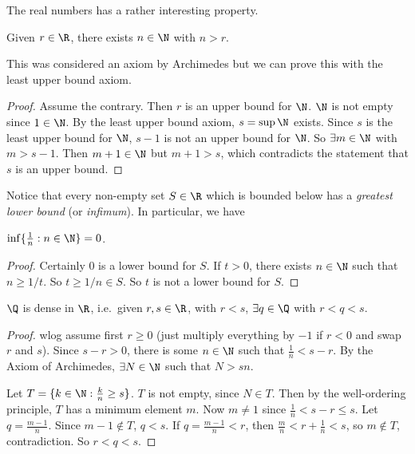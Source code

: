 \documentclass[a4paper]{article}
\begin{document}
The real numbers has a rather interesting property.
\begin{thm}
  Given $r\in \R$, there exists $n\in \N$ with $n > r$.
\end{thm}

This was considered an axiom by Archimedes but we can prove this with the least upper bound axiom.

\begin{proof}
  Assume the contrary. Then $r$ is an upper bound for $\N$. $\N$ is not empty since $1\in \N$. By the least upper bound axiom, $s = \sup \N$ exists. Since $s$ is the least upper bound for $\N$, $s - 1$ is not an upper bound for $\N$. So $\exists m\in \N$ with $m > s - 1$. Then $m + 1\in \N$ but $m + 1 > s$, which contradicts the statement that $s$ is an upper bound.
\end{proof}

Notice that every non-empty set $S\in \R$ which is bounded below has a \emph{greatest lower bound} (or \emph{infimum}). In particular, we have

\begin{prop}
  $\inf\{\frac{1}{n}: n\in \N\} = 0$.
\end{prop}

\begin{proof}
  Certainly $0$ is a lower bound for $S$. If $t > 0$, there exists $n \in \N$ such that $n \geq 1/t$. So $t \geq 1/n\in S$. So $t$ is not a lower bound for $S$.
\end{proof}

\begin{thm}
  $\Q$ is dense in $\R$, i.e.\ given $r, s\in \R$, with $r < s$, $\exists q\in \Q$ with $r < q < s$.
\end{thm}

\begin{proof}
  wlog assume first $r \geq 0$ (just multiply everything by $-1$ if $r < 0$ and swap $r$ and $s$). Since $s - r > 0$, there is some $n \in \N$ such that $\frac{1}{n} < s - r$. By the Axiom of Archimedes, $\exists N\in \N$ such that $N > sn$.

  Let $T = \{k\in \N: \frac{k}{n}\geq s\}$. $T$ is not empty, since $N\in T$. Then by the well-ordering principle, $T$ has a minimum element $m$. Now $m\not= 1$ since $\frac{1}{n} < s - r \leq s$. Let $q = \frac{m - 1}{n}$. Since $m - 1\not\in T$, $q < s$. If $q =\frac{m - 1}{n}< r$, then $\frac{m}{n} < r + \frac{1}{n} < s$, so $m\not\in T$, contradiction. So $r < q < s$.
\end{proof}
\end{document}

